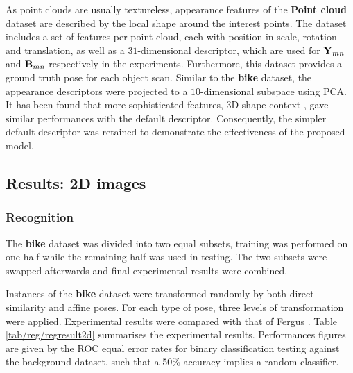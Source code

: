 As point clouds are usually textureless, appearance features of the \textbf{Point cloud} dataset are described by the local shape around the interest points. 
The dataset includes a set of features per point cloud, each with position in scale, rotation and translation, as well as a $31$-dimensional descriptor, which are used for $\mathbf{Y}_{mn}$ and $\mathbf{B}_{mn}$ respectively in the experiments. Furthermore, this dataset provides a ground truth pose for each object scan.
Similar to the \textbf{bike} dataset, the appearance descriptors were projected to a $10$-dimensional subspace using PCA.   
It has been found that more sophisticated features, \eg 3D shape context \cite{Frome2004}, gave similar performances with the default descriptor. Consequently, the simpler default descriptor was retained to demonstrate the effectiveness of the proposed model.


\subsection{Results: 2D images}

\subsubsection{Recognition}

The \textbf{bike} dataset was divided into two equal subsets, training was performed on one half while the remaining half was used in testing. The two subsets were swapped afterwards and final experimental results were combined.

Instances of the \textbf{bike} dataset were transformed randomly by both direct similarity and affine poses. For each type of pose, three levels of transformation were applied. Experimental results were compared with that of Fergus \etal \cite{Fergus2007}.   
Table \ref{tab/reg/regresult2d} summarises the experimental results. 
Performances figures are given by the ROC equal error rates for binary classification testing against the background dataset, such that a 50\% accuracy implies a random classifier. 


